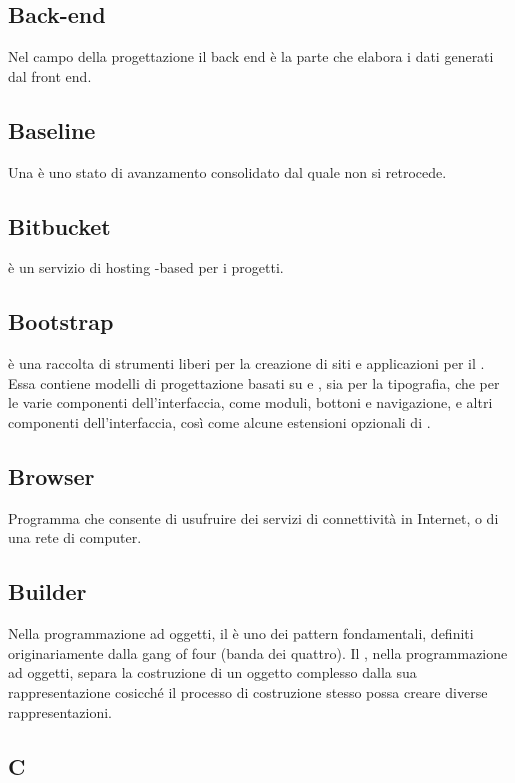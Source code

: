 \subsection{Back-end}
Nel campo della progettazione  il back end è la parte che elabora i dati generati dal front end.

\subsection{Baseline}
Una  è uno stato di avanzamento consolidato dal quale non si retrocede. 

\subsection{Bitbucket}
 è un servizio di hosting -based per i progetti.

\subsection{Bootstrap}
 è una raccolta di strumenti liberi per la creazione di siti e applicazioni per il . Essa contiene modelli di progettazione basati su  e , sia per la tipografia, che per le varie componenti dell'interfaccia, come moduli, bottoni e navigazione, e altri componenti dell'interfaccia, così come alcune estensioni opzionali di .

\subsection{Browser}
Programma che consente di usufruire dei servizi di connettività in Internet, o di una rete di computer.

\subsection{Builder}
Nella programmazione ad oggetti, il  è uno dei pattern fondamentali, definiti originariamente dalla gang of four (banda dei quattro). Il  , nella programmazione ad oggetti, separa la costruzione di un oggetto complesso dalla sua rappresentazione cosicché il processo di costruzione stesso possa creare diverse rappresentazioni.

\newpage

\begin{center}
\Huge\section{\uppercase{C}}
\end{center}

